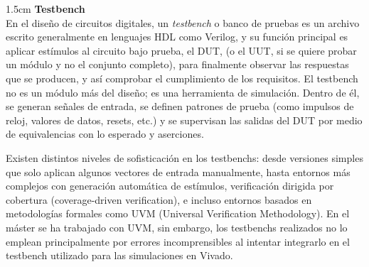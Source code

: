 \begin{adjustwidth}{1.5cm}{}
\label{st:testbench}
\textbf{Testbench} \vspace{0.25cm} \\
En el diseño de circuitos digitales, un \emph{testbench} o banco de pruebas es un archivo escrito generalmente en lenguajes HDL como Verilog, y su función principal es aplicar estímulos al circuito bajo prueba, el \ac{DUT}, (o el \ac{UUT}, si se quiere probar un módulo y no el conjunto completo), para finalmente observar las respuestas que se producen, y así comprobar el cumplimiento de los requisitos. El testbench no es un módulo más del diseño; es una herramienta de simulación. Dentro de él, se generan señales de entrada, se definen patrones de prueba (como impulsos de reloj, valores de datos, resets, etc.) y se supervisan las salidas del DUT por medio de equivalencias con lo esperado y aserciones.

Existen distintos niveles de sofisticación en los testbenchs: desde versiones simples que solo aplican algunos vectores de entrada manualmente, hasta entornos más complejos con generación automática de estímulos, verificación dirigida por cobertura (coverage-driven verification), e incluso entornos basados en metodologías formales como UVM (Universal Verification Methodology). En el máster se ha trabajado con UVM, sin embargo, los testbenchs realizados no lo emplean principalmente por errores incomprensibles al intentar integrarlo en el testbench utilizado para las simulaciones en Vivado.
\end{adjustwidth}

\vspace{0.4em} %

